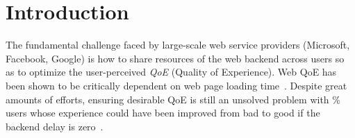 

\section{Introduction}

\noindent 
The fundamental challenge faced by large-scale web service providers (\eg Microsoft, Facebook, Google) is how to share resources of the web backend across users so as to optimize the user-perceived {\em QoE} (Quality of Experience). 
Web QoE has been shown to be critically dependent on web page loading time~\cite{??,??}.
Despite great amounts of efforts, ensuring desirable QoE is still an unsolved problem with \fillme\% users whose experience could have been improved from bad to good if the backend delay is zero~\cite{dqbarge}.


